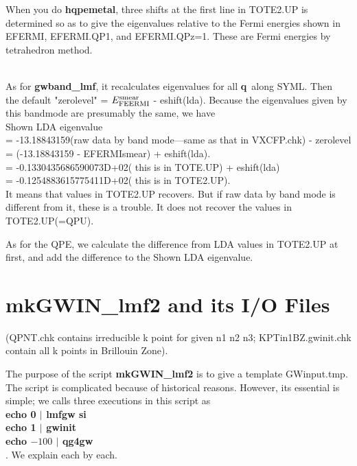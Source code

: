 \documentclass[a4paper,10pt,epsf,fleqn]{article}
\newcommand{\bfq}{{\bf q}}
\newcommand{\exe}[1]{{\bf #1}}
\newcommand{\io}[1]{{\sf  #1}}
\begin{document}
{\begin{enumerate}
When you do \exe{hqpemetal}, three shifts at the first line in \io{TOTE2.UP}
is determined so as to give the eigenvalues relative to the Fermi
energies shown in \io{EFERMI}, \io{EFERMI.QP1}, and \io{EFERMI.QPz=1}. 
These are Fermi energies by tetrahedron method.

\end{enumerate}

~\\

As for {\bf gwband\_lmf}, it recalculates eigenvalues for all \bfq \ along SYML.
Then\\ the default "zerolevel" = $E_{\rm FEERMI}^{\rm smear}$ - eshift(lda). 
Because the eigenvalues given by this bandmode are presumably the same, we have\\
Shown LDA eigenvalue\\
 =  -13.18843159(raw data by band mode---same as that in VXCFP.chk) - zerolevel\\
 = (-13.18843159 - EFERMIsmear) + eshift(lda).\\
 =  -0.1330435686590073D+02( this is in TOTE.UP) + eshift(lda)\\
 =  -0.1254883615775411D+02( this is in TOTE2.UP).\\

It means that values in \io{TOTE2.UP} recovers.
But if raw data by band mode is different from it, these is a trouble. 
It does not recover the values in \io{TOTE2.UP}(=\io{QPU}).

As for the QPE, we calculate the difference from LDA values
in TOTE2.UP at first, and add the difference to the Shown LDA eigenvalue.







\newpage
\section{mkGWIN\_lmf2 and its I/O Files}
(QPNT.chk contains irreducible k
point for given n1 n2 n3; KPTin1BZ.gwinit.chk contain all k points in
Brillouin Zone).

The purpose of the script {\bf mkGWIN\_lmf2} is to give a template \io{GWinput.tmp}.
The script is complicated because of historical reasons. 
However, its essential is simple;
we calls three executions in this script as\\
\exe{echo 0 $|$ lmfgw si}\\
\exe{echo 1 $|$ gwinit}\\
\exe{echo $-100$ $|$ qg4gw}\\
. We explain each by each.

}
\end{document}
